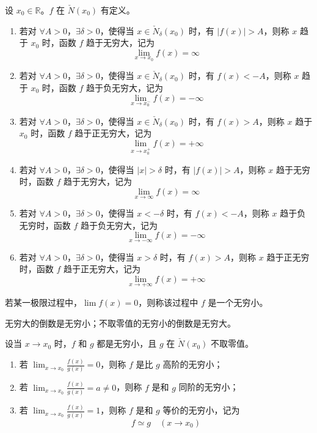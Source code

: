 \begin{definition}
    设 $x_0 \in \mathbb{R}$。$f$ 在 $\check{N}(x_0)$ 有定义。
    \begin{enumerate}
        \item 若对 $\forall A > 0$，$\exists \delta > 0$，使得当 $x \in \check{N}_{\delta}(x_0)$ 时，有 $|f(x)| > A$，则称 $x$ 趋于 $x_0$ 时，函数 $f$ 趋于无穷大，记为
              \[\lim_{x \to x_0}f(x) = \infty\]
        \item 若对 $\forall A > 0$，$\exists \delta > 0$，使得当 $x \in \check{N}_{\delta}(x_0)$ 时，有 $f(x) < -A$，则称 $x$ 趋于 $x_0$ 时，函数 $f$ 趋于负无穷大，记为
              \[\lim_{x \to x_{0}^{-}}f(x) = -\infty\]
        \item 若对 $\forall A > 0$，$\exists \delta > 0$，使得当 $x \in \check{N}_{\delta}(x_0)$ 时，有 $f(x) > A$，则称 $x$ 趋于 $x_0$ 时，函数 $f$ 趋于正无穷大，记为
              \[\lim_{x \to x_{0}^{+}}f(x) = +\infty\]
        \item 若对 $\forall A > 0$，$\exists \delta > 0$，使得当 $|x| > \delta$ 时，有 $|f(x)| > A$，则称 $x$ 趋于无穷时，函数 $f$ 趋于无穷大，记为
              \[\lim_{x \to \infty}f(x) = \infty\]
        \item 若对 $\forall A > 0$，$\exists \delta > 0$，使得当 $x < -\delta$ 时，有 $f(x) < -A$，则称 $x$ 趋于负无穷时，函数 $f$ 趋于负无穷大，记为
              \[\lim_{x \to -\infty}f(x) = -\infty\]
        \item 若对 $\forall A > 0$，$\exists \delta > 0$，使得当 $x > \delta$ 时，有 $f(x) > A$，则称 $x$ 趋于正无穷时，函数 $f$ 趋于正无穷大，记为
              \[\lim_{x \to +\infty}f(x) = +\infty\]
    \end{enumerate}
\end{definition}

\begin{definition}
    若某一极限过程中，$\lim f(x) =  0$，则称该过程中 $f$ 是一个无穷小。
\end{definition}

\begin{theorem}
    无穷大的倒数是无穷小；不取零值的无穷小的倒数是无穷大。
\end{theorem}

\begin{definition}
    设当 $x \to x_0$ 时，$f$ 和 $g$ 都是无穷小，且 $g$ 在 $\check{N}(x_0)$ 不取零值。
    \begin{enumerate}[itemsep=0.5em, topsep=0.5em]
        \item 若 $\displaystyle \lim_{x \to x_0}\frac{f(x)}{g(x)} = 0$，则称 $f$ 是比 $g$ 高阶的无穷小；
        \item 若 $\displaystyle \lim_{x \to x_0}\frac{f(x)}{g(x)} = a \neq 0$，则称 $f$ 是和 $g$ 同阶的无穷小；
        \item 若 $\displaystyle \lim_{x \to x_0}\frac{f(x)}{g(x)} = 1$，则称 $f$ 是和 $g$ 等价的无穷小，记为
              \[f \simeq g\quad (x \to x_0)\]
    \end{enumerate}
\end{definition}

